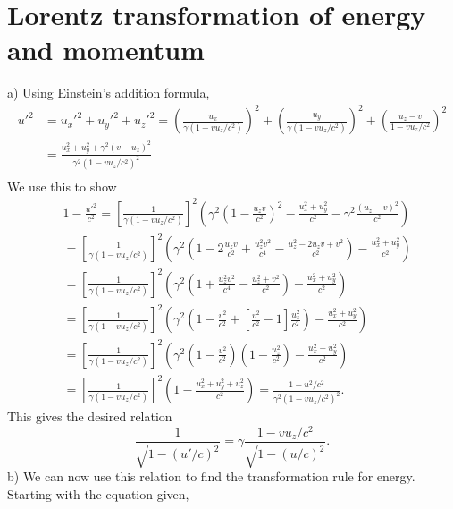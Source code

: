 \documentclass{article}
\begin{document}
    \section{Lorentz transformation of energy and momentum}
        a) Using Einstein's addition formula, 
        \begin{align*}
            u'^2 &= u_x'^2 + u_y'^2 + u_z'^2 = \left(\frac{u_x}{\gamma(1 - v u_z /c^2)}\right)^2 + \left(\frac{u_y}{\gamma(1 - v u_z /c^2)}\right)^2 + \left(\frac{u_z - v}{1 - v u_z /c^2}\right)^2\\
            & = \frac{u_x^2 + u_y^2 + \gamma^2(v - u_z)^2}{\gamma^2(1 - v u_z/c^2)^2} \\
        \end{align*}
        We use this to show
        \begin{align*}
            & 1 - \frac{u'^2}{c^2} = \left[\frac{1}{\gamma(1 - v u_z /c^2)}\right]^2 \left( \gamma^2\left(1 - \frac{u_z v}{c^2}\right)^2- \frac{u_x^2 + u_y ^2}{c^2} - \gamma^2 \frac{(u_z - v)^2}{c^2}\right) \\
            & = \left[\frac{1}{\gamma(1 - v u_z /c^2)}\right]^2 
            \left( \gamma^2\left(1 - 2\frac{u_z v}{c^2} + \frac{u_z^2 v^2}{c^4} - \frac{u_z^2 - 2u_zv + v^2}{c^2}\right) - \frac{u_x^2 + u_y ^2}{c^2} \right) \\
            & = \left[\frac{1}{\gamma(1 - v u_z /c^2)}\right]^2 
            \left( \gamma^2\left(1 + \frac{u_z^2 v^2}{c^4} - \frac{u_z^2 + v^2}{c^2}\right) - \frac{u_x^2 + u_y^2}{c^2} \right) \\
            & = \left[\frac{1}{\gamma(1 - v u_z /c^2)}\right]^2 
            \left( \gamma^2\left(1- \frac{v^2}{c^2}  + \left[\frac{v^2}{c^2} -1\right]\frac{u_z^2}{c^2} \right) - \frac{u_x^2 + u_y^2}{c^2} \right) \\
            & = \left[\frac{1}{\gamma(1 - v u_z /c^2)}\right]^2
            \left( \gamma^2\left(1- \frac{v^2}{c^2} \right)\left(  1-\frac{u_z^2}{c^2} \right) - \frac{u_x^2 + u_y^2}{c^2} \right) \\
            & = \left[\frac{1}{\gamma(1 - v u_z /c^2)}\right]^2
            \left( 1 - \frac{u_x^2 + u_y^2 + u_z^2}{c^2} \right) = \frac{1 - u^2/c^2}{\gamma^2(1 - v u_z /c^2)^2}.
        \end{align*}
        This gives the desired relation
        \begin{equation*}
            \frac{1}{\sqrt{1 - (u'/c)^2}} = \gamma \frac{1 - v u_z/c^2}{\sqrt{1 - (u/c)^2}}.
        \end{equation*}
        b) We can now use this relation to find the transformation rule for energy. Starting with the equation given,
\end{document}
